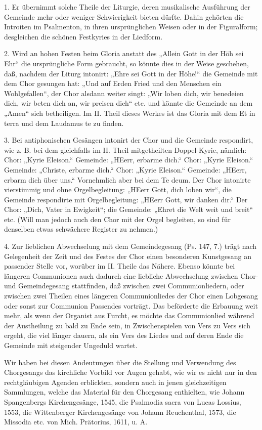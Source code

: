 1. Er übernimmt solche Theile der Liturgie, deren musikalische Ausführung der Gemeinde mehr oder weniger Schwierigkeit bieten dürfte. Dahin gehörten die Introiten im Psalmenton, in ihren ursprünglichen Weisen oder in der Figuralform; desgleichen die schönen Festkyries in der Liedform.

2. Wird an hohen Festen beim Gloria anstatt des „Allein Gott in der Höh sei Ehr“ die ursprüngliche Form gebraucht, so könnte dies in der Weise geschehen, daß, nachdem der Liturg intonirt: „Ehre sei Gott in der Höhe!“ die Gemeinde mit dem Chor gesungen hat: „Und auf Erden Fried und den Menschen ein Wohlgefallen“, der Chor alsdann weiter singt: „Wir loben dich, wir benedeien dich, wir beten dich an, wir preisen dich“ etc. und könnte die Gemeinde an dem „Amen“ sich betheiligen. Im II. Theil dieses Werkes ist das Gloria mit dem Et in terra und dem Laudamus te zu finden.

3. Bei antiphonischen Gesängen intonirt der Chor und die Gemeinde respondirt, wie z. B. bei dem gleichfalls im II. Theil mitgetheilten Doppel-Kyrie, nämlich: Chor: „Kyrie Eleison.“ Gemeinde: „HEerr, erbarme dich.“ Chor: „Kyrie Eleison.“ Gemeinde: „Christe, erbarme dich.“ Chor: „Kyrie Eleison.“ Gemeinde: „HEerr, erbarm dich über uns.“ Vornehmlich aber bei dem Te deum. Der Chor intonirte vierstimmig und ohne Orgelbegleitung: „HEerr Gott, dich loben wir“, die Gemeinde respondirte mit Orgelbegleitung: „HEerr Gott, wir danken dir.“ Der Chor: „Dich, Vater in Ewigkeit“; die Gemeinde: „Ehret die Welt weit und breit“ etc. (Will man jedoch auch den Chor mit der Orgel begleiten, so sind für denselben etwas schwächere Register zu nehmen.)

4. Zur lieblichen Abwechselung mit dem Gemeindegesang (Ps. 147, 7.) trägt nach Gelegenheit der Zeit und des Festes der Chor einen besonderen Kunstgesang an passender Stelle vor, worüber im II. Theile das Nähere. Ebenso könnte bei längeren Communionen auch dadurch eine liebliche Abwechselung zwischen Chor- und Gemeindegesang stattfinden, daß zwischen zwei Communionliedern, oder zwischen zwei Theilen eines längeren Communionliedes der Chor einen Lobgesang oder sonst zur Communion Passendes vorträgt. Das beförderte die Erbauung weit mehr, als wenn der Organist aus Furcht, es möchte das Communionlied während der Austheilung zu bald zu Ende sein, in
Zwischenspielen von Vers zu Vers sich ergeht, die viel länger dauern, als ein Vers des Liedes und auf deren Ende die Gemeinde mit steigender Ungeduld wartet.

Wir haben bei diesen Andeutungen über die Stellung und Verwendung des Chorgesangs das kirchliche Vorbild vor Augen gehabt, wie wir es nicht nur in den rechtgläubigen Agenden erblickten, sondern auch in jenen gleichzeitigen Sammlungen, welche das Material für den Chorgesang enthielten, wie Johann Spangenbergs Kirchengesänge, 1545, die Psalmodia sacra von Lucas Lossius, 1553, die Wittenberger Kirchengesänge von Johann Reuchenthal, 1573, die Missodia etc. von Mich. Prätorius, 1611, u. A.

